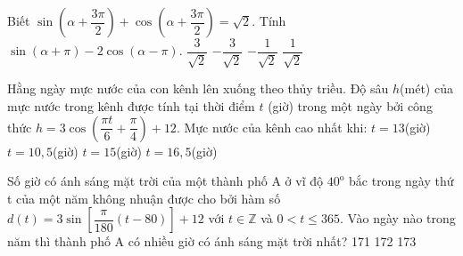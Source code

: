 \begin{ex}
	Biết $\sin \left(\alpha +\dfrac{3\pi }{2}\right)+\cos \left(\alpha +\dfrac{3\pi }{2}\right)=\sqrt{2}$. Tính $\sin \left(\alpha +\pi\right)-2\cos \left(\alpha -\pi\right)$.
	\choice
	{$\dfrac{3}{\sqrt{2}}$}
	{\True $-\dfrac{3}{\sqrt{2}}$}
	{$-\dfrac{1}{\sqrt{2}}$}
	{$\dfrac{1}{\sqrt{2}}$}
\end{ex}
\begin{ex}
	Hằng ngày mực nước của con kênh lên xuống theo thủy triều. Độ sâu $h$(mét) của mực nước trong kênh được tính tại thời điểm $t$ (giờ) trong một ngày bởi công thức $h=3\cos \left(\dfrac{\pi t}{6}+\dfrac{\pi }{4}\right)+12$. Mực nước của kênh cao nhất khi:
	\choice
	{$t=13$(giờ)}
	{\True $t=10{,}5$(giờ)}
	{$t=15$(giờ)}
	{$t=16{,}5$(giờ)}
\end{ex}
\begin{ex}
	Số giờ có ánh sáng mặt trời của một thành phố A ở vĩ độ ${{40}^{\text{o}}}$ bắc trong ngày thứ t của một năm không nhuận được cho bởi hàm số $d(t)=3\sin \left[\dfrac{\pi }{180}(t-80)\right]+12$ với $t\in \mathbb{Z}$ và $0<t\le 365$. Vào ngày nào trong năm thì thành phố A có nhiều giờ có ánh sáng mặt trời nhất?
	\choice
	{}
	{171}
	{172}
	{173}
\end{ex}

